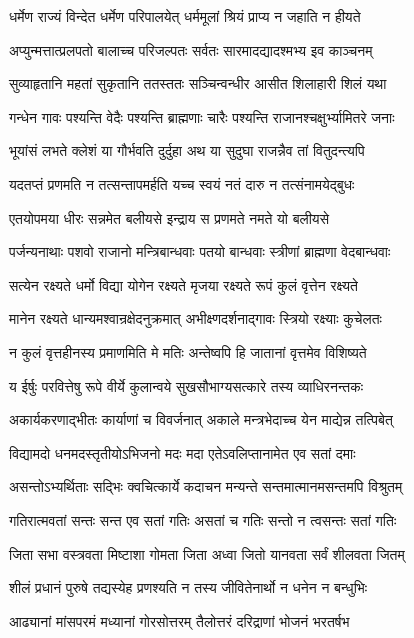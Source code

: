 \twolineshloka
{धर्मेण राज्यं विन्देत धर्मेण परिपालयेत्}
{धर्ममूलां श्रियं प्राप्य न जहाति न हीयते}


\twolineshloka
{अप्युन्मत्तात्प्रलपतो बालाच्च परिजल्पतः}
{सर्वतः सारमादद्यादश्मभ्य इव काञ्चनम्}


\twolineshloka
{सुव्याहृतानि महतां सुकृतानि ततस्ततः}
{सञ्चिन्वन्धीर आसीत शिलाहारी शिलं यथा}


\twolineshloka
{गन्धेन गावः पश्यन्ति वेदैः पश्यन्ति ब्राह्मणाः}
{चारैः पश्यन्ति राजानश्चक्षुर्भ्यामितरे जनाः}


\twolineshloka
{भूयांसं लभते क्लेशं या गौर्भवति दुर्दुहा}
{अथ या सुदुघा राजन्नैव तां वितुदन्त्यपि}


\twolineshloka
{यदतप्तं प्रणमति न तत्सन्तापमर्हति}
{यच्च स्वयं नतं दारु न तत्संनामयेद्बुधः}


\twolineshloka
{एतयोपमया धीरः सन्नमेत बलीयसे}
{इन्द्राय स प्रणमते नमते यो बलीयसे}


\twolineshloka
{पर्जन्यनाथाः पशवो राजानो मन्त्रिबान्धवाः}
{पतयो बान्धवाः स्त्रीणां ब्राह्मणा वेदबान्धवाः}


\twolineshloka
{सत्येन रक्ष्यते धर्मो विद्या योगेन रक्ष्यते}
{मृजया रक्ष्यते रूपं कुलं वृत्तेन रक्ष्यते}


\twolineshloka
{मानेन रक्ष्यते धान्यमश्वान्रक्षेदनुक्रमात्}
{अभीक्ष्णदर्शनाद्गावः स्त्रियो रक्ष्याः कुचेलतः}


\twolineshloka
{न कुलं वृत्तहीनस्य प्रमाणमिति मे मतिः}
{अन्तेष्वपि हि जातानां वृत्तमेव विशिष्यते}


\twolineshloka
{य ईर्षुः परवित्तेषु रूपे वीर्ये कुलान्वये}
{सुखसौभाग्यसत्कारे तस्य व्याधिरनन्तकः}


\twolineshloka
{अकार्यकरणाद्भीतः कार्याणां च विवर्जनात्}
{अकाले मन्त्रभेदाच्च येन माद्येन्न तत्पिबेत्}


\twolineshloka
{विद्यामदो धनमदस्तृतीयोऽभिजनो मदः}
{मदा एतेऽवलिप्तानामेत एव सतां दमाः}


\twolineshloka
{असन्तोऽभ्यर्थिताः सद्भिः क्वचित्कार्ये कदाचन}
{मन्यन्ते सन्तमात्मानमसन्तमपि विश्रुतम्}


\twolineshloka
{गतिरात्मवतां सन्तः सन्त एव सतां गतिः}
{असतां च गतिः सन्तो न त्वसन्तः सतां गतिः}


\twolineshloka
{जिता सभा वस्त्रवता मिष्टाशा गोमता जिता}
{अध्वा जितो यानवता सर्वं शीलवता जितम्}


\twolineshloka
{शीलं प्रधानं पुरुषे तद्यस्येह प्रणश्यति}
{न तस्य जीवितेनार्थो न धनेन न बन्धुभिः}


\twolineshloka
{आढ्यानां मांसपरमं मध्यानां गोरसोत्तरम्}
{तैलोत्तरं दरिद्राणां भोजनं भरतर्षभ}


